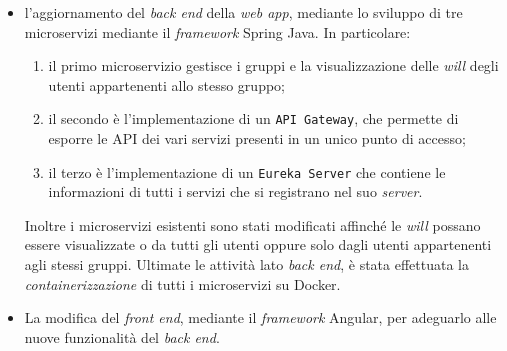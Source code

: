 \begin{itemize}
      \item l'aggiornamento del \textit{back
                  end} della \textit{web app}, mediante lo sviluppo di tre
            microservizi
            mediante il \textit{framework} Spring Java.
            In particolare:
            \begin{enumerate}
                  \item il primo microservizio	gestisce i gruppi e la
                        visualizzazione delle
                        \textit{will}
                        degli utenti appartenenti allo stesso gruppo;
                  \item il secondo è l'implementazione di un
                        \texttt{API Gateway}, che permette di esporre le
                        API dei vari servizi
                        presenti in un
                        unico punto di accesso;
                  \item il terzo è l'implementazione di un \texttt{Eureka
                              Server}
                        che
                        contiene le informazioni di tutti i servizi che si
                        registrano nel suo \textit{server}.
            \end{enumerate}
            Inoltre i microservizi esistenti sono stati modificati affinché le
            \textit{will} possano essere visualizzate o da tutti gli utenti oppure solo
            dagli utenti appartenenti agli stessi gruppi.
            Ultimate le attività lato \textit{back end}, è stata effettuata la
            \textit{containerizzazione} di tutti i microservizi su
            Docker.
      \item La modifica del \textit{front end},
            mediante il \textit{framework} Angular, per adeguarlo alle nuove
            funzionalità del
            \textit{back end}.
\end{itemize}

%
%

\endgroup

\vfill